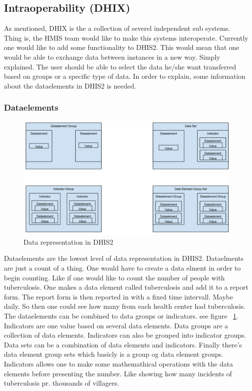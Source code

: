 \subsection{Intraoperability (DHIX)}
 As mentioned, DHIX is the a collection of severel independent sub systems.
Thing is, the HMIS team would like to make this systems interoperate. 
Currently one would like to add some functionality to DHIS2. 
This would mean that one would be able to exchange data between instances in a new way.
Simply explained. The user should be able to select the data he/she want transferred based on groups or a specific type of data.
In order to explain, some information about the dataelements in DHIS2 is needed.
\subsubsection{Dataelements}
\begin{figure}
\centering
\includegraphics[width=12cm]{empirical/images/data_rep_dhis2}
\caption{Data representation in DHIS2}
\label{fig:data_rep}
\end{figure}
Dataelements are the lowest level of data representation in DHIS2. 
Dataelments are just a count of a thing. One would have to create a data elment in order to begin counting.
Like if one would like to count the number of people with tuberculosis. 
One makes a data element called tuberculosis and add it to a report form. The report form is then reported in with a fixed time intervall. 
Maybe daily. So then one could see how many from each health center had tuberculosis.
The dataelements can be combined to data groups or indicators. see figure ~\ref{fig:data_rep}.
Indicators are one value based on several data elements. Data groups are a collection of data elements.
Indicators can also be grouped into indicator groups. Data sets can be a combination of data elements and indicators. 
Finally there's data element group sets which basicly is a group og data element groups.
Indicators allows one to make some mathemathical operations with the data elements before presenting the number. 
Like showing how many incidents of tuberculosis pr. thousands of villagers.

